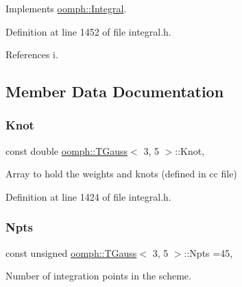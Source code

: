 Implements \hyperlink{classoomph_1_1Integral_ac65335e2aab120b285b3d6c294507b06}{oomph\+::\+Integral}.



Definition at line 1452 of file integral.\+h.



References i.



\subsection{Member Data Documentation}
\mbox{\label{classoomph_1_1TGauss_3_013_00_015_01_4_a456a59024af9e0fa18b05fe8c63197e7}} 
\subsubsection{\texorpdfstring{Knot}{Knot}}
{\footnotesize\ttfamily const double \hyperlink{classoomph_1_1TGauss}{oomph\+::\+T\+Gauss}$<$ 3, 5 $>$\+::Knot\hspace{0.3cm}{\ttfamily [static]}, {\ttfamily [private]}}



Array to hold the weights and knots (defined in cc file) 



Definition at line 1424 of file integral.\+h.

\mbox{\label{classoomph_1_1TGauss_3_013_00_015_01_4_a24395831f6818cf1fbd9c5234d3026c2}} 
\subsubsection{\texorpdfstring{Npts}{Npts}}
{\footnotesize\ttfamily const unsigned \hyperlink{classoomph_1_1TGauss}{oomph\+::\+T\+Gauss}$<$ 3, 5 $>$\+::Npts =45\hspace{0.3cm}{\ttfamily [static]}, {\ttfamily [private]}}



Number of integration points in the scheme. 



